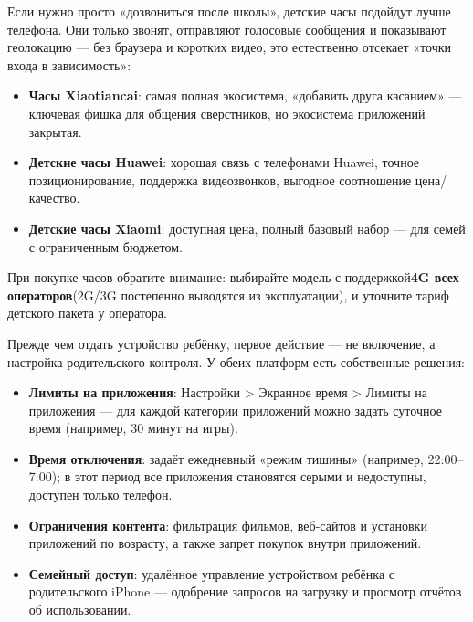 
Если нужно просто «дозвониться после школы», детские часы подойдут лучше телефона. Они только звонят, отправляют голосовые сообщения и показывают геолокацию — без браузера и коротких видео, это естественно отсекает «точки входа в зависимость»:

\begin{itemize}
  \item \textbf{Часы Xiaotiancai}: самая полная экосистема, «добавить друга касанием» — ключевая фишка для общения сверстников, но экосистема приложений закрытая.
  \item \textbf{Детские часы Huawei}: хорошая связь с телефонами Huawei, точное позиционирование, поддержка видеозвонков, выгодное соотношение цена/качество.
  \item \textbf{Детские часы Xiaomi}: доступная цена, полный базовый набор — для семей с ограниченным бюджетом.
\end{itemize}

При покупке часов обратите внимание: выбирайте модель с поддержкой\textbf{4G всех операторов}(2G/3G постепенно выводятся из эксплуатации), и уточните тариф детского пакета у оператора.


Прежде чем отдать устройство ребёнку, первое действие — не включение, а настройка родительского контроля. У обеих платформ есть собственные решения:


\begin{itemize}
  \item \textbf{Лимиты на приложения}: Настройки > Экранное время > Лимиты на приложения — для каждой категории приложений можно задать суточное время (например, 30 минут на игры).
  \item \textbf{Время отключения}: задаёт ежедневный «режим тишины» (например, 22:00–7:00); в этот период все приложения становятся серыми и недоступны, доступен только телефон.
  \item \textbf{Ограничения контента}: фильтрация фильмов, веб-сайтов и установки приложений по возрасту, а также запрет покупок внутри приложений.
  \item \textbf{Семейный доступ}: удалённое управление устройством ребёнка с родительского iPhone — одобрение запросов на загрузку и просмотр отчётов об использовании.
\end{itemize}

